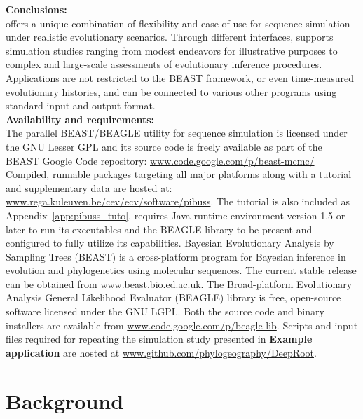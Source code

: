 \noindent
\textbf{Conclusions:} \\
{\bussname} offers a unique combination of flexibility and ease-of-use for sequence simulation under realistic evolutionary scenarios. 
Through different interfaces, {\bussname} supports simulation studies ranging from modest endeavors for illustrative purposes  to complex and large-scale assessments of evolutionary inference procedures.
Applications are not restricted to the BEAST framework, or even time-measured evolutionary histories, and {\bussname} can be connected to various other programs using standard input and output format. \\

\noindent
\textbf{Availability and requirements:} \\
The parallel BEAST/BEAGLE utility for sequence simulation is licensed under the GNU Lesser GPL and its source code is freely available as part of the BEAST Google Code repository: \url{www.code.google.com/p/beast-mcmc/}
Compiled, runnable packages targeting all major platforms along with a tutorial and supplementary data are hosted at:
\url{www.rega.kuleuven.be/cev/ecv/software/pibuss}.
The tutorial is also included as Appendix~\ref{app:pibuss_tuto}.
{\bussname} requires Java runtime environment version 1.5 or later to run its executables and the BEAGLE library to be present and configured to fully utilize its capabilities.
Bayesian Evolutionary Analysis by Sampling Trees (BEAST) is a cross-platform program for Bayesian inference in evolution and phylogenetics using molecular sequences. 
The current stable release can be obtained from \url{www.beast.bio.ed.ac.uk}.
The Broad-platform Evolutionary Analysis General Likelihood Evaluator (BEAGLE) library is free, open-source software licensed under the GNU LGPL. Both the source code and binary installers are available from \url{www.code.google.com/p/beagle-lib}. 
Scripts and input files required for repeating the simulation study presented in {\bf{Example application}} are hosted at \url{www.github.com/phylogeography/DeepRoot}.

\section{Background}

